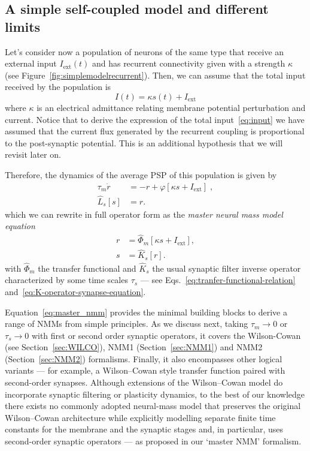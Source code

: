\documentclass[11pt]{article}
\numberwithin{equation}{section}
\begin{document}
\subsection{A simple self-coupled model and different limits} 
Let's consider now a population of neurons of the same type that receive an external input $I_\text{ext}(t)$
and has recurrent connectivity given with a strength $\kappa$ (see Figure~\ref{fig:simplemodelrecurrent}). 
Then, we can assume that the total input received by the population is
\begin{equation}\label{eq:input}
I(t) = \kappa s(t) + I_\text{ext}
\end{equation}
where $\kappa$ is an electrical admittance relating membrane potential perturbation and current.
Notice that to derive the expression of the total input~\eqref{eq:input} we have assumed
that the current flux generated by the recurrent coupling is proportional to the post-synaptic potential.
This is an additional hypothesis that we will revisit later on.

Therefore, the dynamics of the average PSP of this population is given by
\begin{equation}\label{eq:simpleNMM}
\begin{aligned}
 \tau_m \dot r &= -r + \varphi[\kappa s +  I_\text{ext}] \;,\\
 \hat L_s[s] &= r.
 \end{aligned}
\end{equation}
which we can rewrite in full operator form as the\textit{ master neural mass model equation}
\begin{equation}\label{eq:master_nmm}
 \boxed{\begin{aligned}
 r &=  \hat \Phi_m [\kappa s +  I_\text{ext}] ,\\
 s &= \hat K_s [r].
 \end{aligned}}
\end{equation}
with $\hat \Phi_m$ the transfer functional and  $\hat K_s$ the usual synaptic filter inverse operator characterized by some time scales $\tau_s$ --- see Eqs.~\eqref{eq:tranfer-functional-relation} and~\eqref{eq:K-operator-synapse-equation}.

Equation~\ref{eq:master_nmm} provides the minimal building blocks to derive a range
of NMMs from simple principles.  As we discuss next, taking
$\tau_m\to 0$ or $\tau_s\to 0$ with first or second order synaptic operators, it covers the Wilson-Cowan (see Section~\ref{sec:WILCO}), NMM1 (Section~\ref{sec:NMM1}) and NMM2 (Section~\ref{sec:NMM2}) formalisms.   
Finally, it also encompasses other logical variants — for example, a Wilson–Cowan style transfer function paired with second-order synapses. Although extensions of the Wilson–Cowan model do incorporate synaptic filtering or plasticity dynamics, to the best of our knowledge there exists no commonly adopted neural-mass model that preserves the original Wilson–Cowan architecture while explicitly modelling separate finite time constants for the membrane and the synaptic stages and, in particular, uses second-order synaptic operators — as proposed in our ‘master NMM’ formalism.
\end{document}
